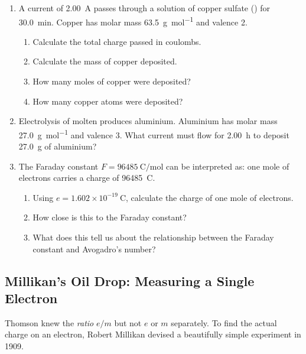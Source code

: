 \documentclass[12pt, a4paper]{book}
\theoremstyle{definition}
\begin{document}
\begin{problembox}
\begin{enumerate}[label=\textbf{\arabic*.}]
  \item A current of \SI{2.00}{\ampere} passes through a solution
        of copper sulfate () for \SI{30.0}{\minute}.
        Copper has molar mass \SI{63.5}{\gram\per\mol} and
        valence 2.
        \begin{enumerate}[label=(\alph*)]
          \item Calculate the total charge passed in coulombs.
          \item Calculate the mass of copper deposited.
          \item How many moles of copper were deposited?
          \item How many copper atoms were deposited?
        \end{enumerate}

  \item Electrolysis of molten  produces aluminium.
        Aluminium has molar mass \SI{27.0}{\gram\per\mol}
        and valence 3.
        What current must flow for \SI{2.00}{\hour}
        to deposit \SI{27.0}{\gram} of aluminium?

  \item The Faraday constant $F = \SI{96485}{\coulomb\per\mol}$
        can be interpreted as: one mole of electrons
        carries a charge of \SI{96485}{\coulomb}.
        \begin{enumerate}[label=(\alph*)]
          \item Using $e = 1.602\times10^{-19}\ \si{\coulomb}$,
                calculate the charge of one mole of electrons.
          \item How close is this to the Faraday constant?
          \item What does this tell us about the relationship
                between the Faraday constant and Avogadro's number?
        \end{enumerate}
\end{enumerate}
\end{problembox}

\subsection{Millikan's Oil Drop: Measuring a Single Electron}

Thomson knew the \emph{ratio} $e/m$ but not $e$ or $m$ separately.
To find the actual charge on an electron,
Robert Millikan devised a beautifully simple experiment in 1909.
\end{document}
